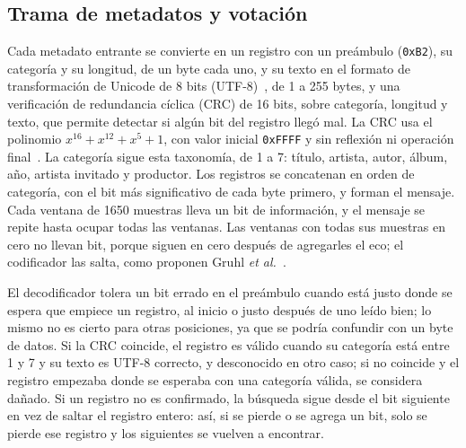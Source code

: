 \subsection{Trama de metadatos y votación}

Cada metadato entrante se convierte en un registro con un preámbulo (\texttt{0xB2}), su categoría y su longitud, de un byte cada uno, y su texto en el formato de transformación de Unicode de 8 bits (UTF-8)~\cite{rfc3629}, de 1 a 255 bytes, y una verificación de redundancia cíclica (CRC) de 16 bits, sobre categoría, longitud y texto, que permite detectar si algún bit del registro llegó mal. La CRC usa el polinomio $x^{16}+x^{12}+x^{5}+1$, con valor inicial \texttt{0xFFFF} y sin reflexión ni operación final~\cite{reveng_crc}. La categoría sigue esta taxonomía, de 1 a 7: título, artista, autor, álbum, año, artista invitado y productor. Los registros se concatenan en orden de categoría, con el bit más significativo de cada byte primero, y forman el mensaje. Cada ventana de 1650 muestras lleva un bit de información, y el mensaje se repite hasta ocupar todas las ventanas. Las ventanas con todas sus muestras en cero no llevan bit, porque siguen en cero después de agregarles el eco; el codificador las salta, como proponen Gruhl \textit{et al.}~\cite{gruhl_echo_hiding}.


El decodificador tolera un bit errado en el preámbulo cuando está justo donde se espera que empiece un registro, al inicio o justo después de uno leído bien; lo mismo no es cierto para otras posiciones, ya que se podría confundir con un byte de datos. Si la CRC coincide, el registro es válido cuando su categoría está entre 1 y 7 y su texto es UTF-8 correcto, y desconocido en otro caso; si no coincide y el registro empezaba donde se esperaba con una categoría válida, se considera dañado. Si un registro no es confirmado, la búsqueda sigue desde el bit siguiente en vez de saltar el registro entero: así, si se pierde o se agrega un bit, solo se pierde ese registro y los siguientes se vuelven a encontrar.

